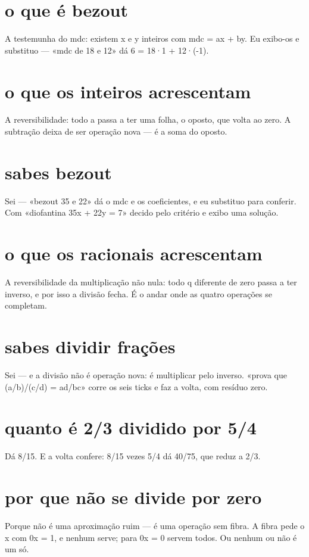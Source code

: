 \documentclass[11pt,a4paper]{article}
\begin{document}
\section{o que é bezout}
A testemunha do mdc: existem x e y inteiros com mdc = ax + by. Eu exibo-os e
substituo --- «mdc de 18 e 12» dá 6 = 18·1 + 12·(-1).

\section{o que os inteiros acrescentam}
A reversibilidade: todo a passa a ter uma folha, o oposto, que volta ao zero. A
subtração deixa de ser operação nova --- é a soma do oposto.

\section{sabes bezout}
Sei --- «bezout 35 e 22» dá o mdc e os coeficientes, e eu substituo para conferir.
Com «diofantina 35x + 22y = 7» decido pelo critério e exibo uma solução.

\section{o que os racionais acrescentam}
A reversibilidade da multiplicação não nula: todo q diferente de zero passa a ter
inverso, e por isso a divisão fecha. É o andar onde as quatro operações se completam.

\section{sabes dividir frações}
Sei --- e a divisão não é operação nova: é multiplicar pelo inverso. «prova que
(a/b)/(c/d) = ad/bc» corre os seis ticks e faz a volta, com resíduo zero.

\section{quanto é 2/3 dividido por 5/4}
Dá 8/15. E a volta confere: 8/15 vezes 5/4 dá 40/75, que reduz a 2/3.

\section{por que não se divide por zero}
Porque não é uma aproximação ruim --- é uma operação sem fibra. A fibra pede o x com
0x = 1, e nenhum serve; para 0x = 0 servem todos. Ou nenhum ou não é um só.
\end{document}
